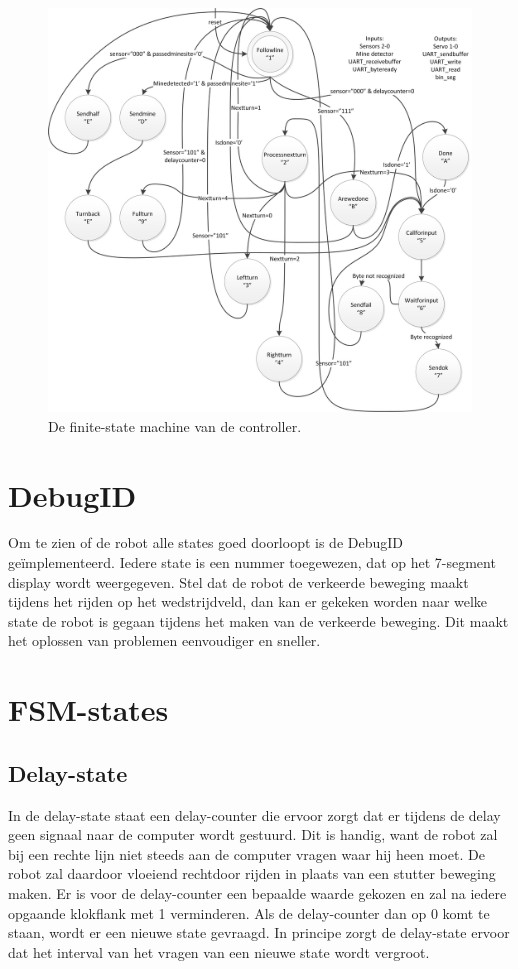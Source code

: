 \documentclass{report}
\begin{document}
\begin{figure}
\centering
\includegraphics[scale=0.5]{../bijlagen/FSMMain.png}
\caption{De finite-state machine van de controller.}
\label{fig:fsmmain}
\end{figure}

\section{DebugID}
Om te zien of de robot alle states goed doorloopt is de DebugID ge\"{i}mplementeerd.
Iedere state is een nummer toegewezen, dat op het 7-segment display wordt weergegeven.
Stel dat de robot de verkeerde beweging maakt tijdens het rijden op het wedstrijdveld, dan kan er gekeken worden naar welke state de robot is gegaan tijdens het maken van de verkeerde beweging.
Dit maakt het oplossen van problemen eenvoudiger en sneller.


\section{FSM-states}

\subsection{Delay-state}
In de delay-state staat een delay-counter die ervoor zorgt dat er tijdens de delay geen signaal naar de computer wordt gestuurd.
Dit is handig, want de robot zal bij een rechte lijn niet steeds aan de computer vragen waar hij heen moet.
De robot zal daardoor vloeiend rechtdoor rijden in plaats van een stutter beweging maken.
Er is voor de delay-counter een bepaalde waarde gekozen en zal na iedere opgaande klokflank met 1 verminderen.
Als de delay-counter dan op 0 komt te staan, wordt er een nieuwe state gevraagd.
In principe zorgt de delay-state ervoor dat het interval van het vragen van een nieuwe state wordt vergroot.
\end{document}
